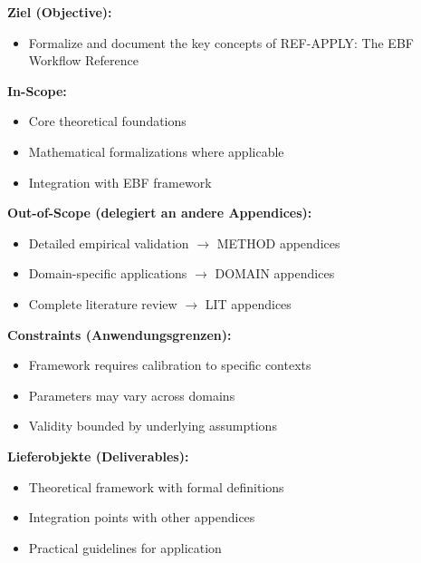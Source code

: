
\begin{tcolorbox}[
    colback=orange!5!white,
    colframe=orange!75!black,
    title={\textbf{Appendix Scope: Ziel / In-Scope / Out-of-Scope / Constraints}},
    fonttitle=\bfseries
]

\textbf{Ziel (Objective):}
\begin{itemize}[nosep]
    \item Formalize and document the key concepts of REF-APPLY: The EBF Workflow Reference
\end{itemize}

\textbf{In-Scope:}
\begin{itemize}[nosep]
    \item Core theoretical foundations
    \item Mathematical formalizations where applicable
    \item Integration with EBF framework
\end{itemize}

\textbf{Out-of-Scope (delegiert an andere Appendices):}
\begin{itemize}[nosep]
    \item Detailed empirical validation $\rightarrow$ METHOD appendices
    \item Domain-specific applications $\rightarrow$ DOMAIN appendices
    \item Complete literature review $\rightarrow$ LIT appendices
\end{itemize}

\textbf{Constraints (Anwendungsgrenzen):}
\begin{itemize}[nosep]
    \item Framework requires calibration to specific contexts
    \item Parameters may vary across domains
    \item Validity bounded by underlying assumptions
\end{itemize}

\textbf{Lieferobjekte (Deliverables):}
\begin{itemize}[nosep]
    \item Theoretical framework with formal definitions
    \item Integration points with other appendices
    \item Practical guidelines for application
\end{itemize}

\end{tcolorbox}



